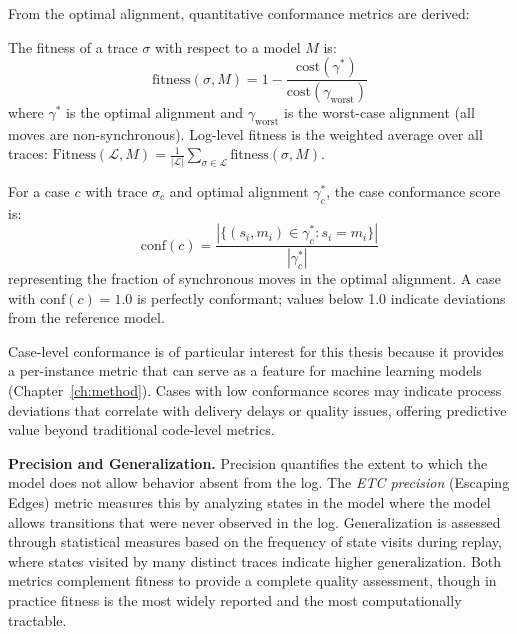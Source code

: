 From the optimal alignment, quantitative conformance metrics are derived:

\begin{definition}
\label{def:fitness}
The fitness of a trace $\sigma$ with respect to a model $M$ is:
\begin{equation}
\label{eq:fitness}
\text{fitness}(\sigma, M) = 1 - \frac{\text{cost}(\gamma^*)}
{\text{cost}(\gamma_{\text{worst}})}
\end{equation}
where $\gamma^*$ is the optimal alignment and $\gamma_{\text{worst}}$ is
the worst-case alignment (all moves are non-synchronous). Log-level fitness
is the weighted average over all traces:
$\text{Fitness}(\mathcal{L}, M) = \frac{1}{|\mathcal{L}|} \sum_{\sigma
\in \mathcal{L}} \text{fitness}(\sigma, M)$.
\end{definition}

\begin{definition}
\label{def:case-conformance}
For a case $c$ with trace $\sigma_c$ and optimal alignment $\gamma^*_c$,
the case conformance score is:
\begin{equation}
\label{eq:case-conformance-cap2}
\text{conf}(c) = \frac{|\{(s_i, m_i) \in \gamma^*_c : s_i = m_i\}|}
{|\gamma^*_c|}
\end{equation}
representing the fraction of synchronous moves in the optimal alignment.
A case with $\text{conf}(c) = 1.0$ is perfectly conformant; values below
1.0 indicate deviations from the reference model.
\end{definition}

Case-level conformance is of particular interest for this thesis because it
provides a per-instance metric that can serve as a feature for machine
learning models (Chapter~\ref{ch:method}). Cases with low conformance
scores may indicate process deviations that correlate with delivery delays
or quality issues, offering predictive value beyond traditional code-level
metrics.

\textbf{Precision and Generalization.} Precision quantifies the extent to
which the model does not allow behavior absent from the log. The
\emph{ETC precision} (Escaping Edges) metric measures this by analyzing
states in the model where the model allows transitions that were never
observed in the log. Generalization is assessed through statistical
measures based on the frequency of state visits during replay, where
states visited by many distinct traces indicate higher generalization.
Both metrics complement fitness to provide a complete quality assessment,
though in practice fitness is the most widely reported and the most
computationally tractable.


